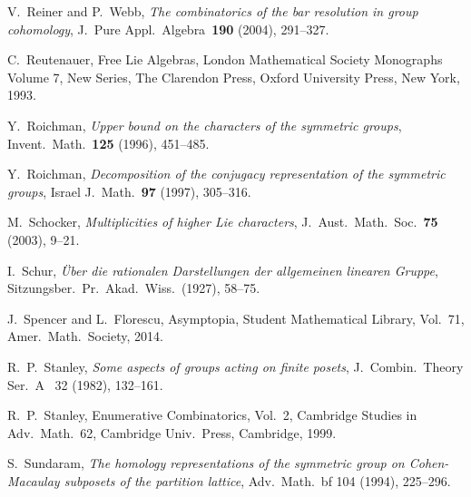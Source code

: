 \documentclass[12pt]%
{amsart}
\def\red#1{{\color{red}{#1}}}
\theoremstyle{plain}
\theoremstyle{definition}
\theoremstyle{remark}
\begin{document}
\begin{thebibliography}{}
    V.\ Reiner and P.\ Webb, 
    {\em The combinatorics of the bar resolution in group cohomology}, 
    J.\ Pure Appl.\ Algebra~{\bf 190} (2004), 291--327.

    C.\ Reutenauer, 
    Free Lie Algebras, 
    London Mathematical Society Monographs Volume 7, New Series, 
    The Clarendon Press, Oxford University Press, New York, 1993.

    Y.\ Roichman, 
    {\em Upper bound on the characters of the symmetric groups}, 
    Invent.\  Math.~{\bf 125} (1996), 451--485.
    
    Y.\ Roichman, 
    {\em Decomposition of the conjugacy representation of the symmetric groups}, 
    Israel J.\ Math.~{\bf 97} (1997), 305--316.

    M.\ Schocker, 
    {\em Multiplicities of higher Lie characters}, 
    J.\ Aust.\ Math.\ Soc.~{\bf 75} (2003), 9--21.

    I.\ Schur, 
    {\em \"Uber die rationalen Darstellungen der allgemeinen linearen Gruppe}, 
    Sitzungsber.\ Pr.\ Akad.\ Wiss.\ (1927), 58--75.

    J.\ Spencer and L.\ Florescu,
    Asymptopia, 
    Student Mathematical Library, Vol.\ 71, Amer.\ Math.\ Society, 2014.

    R.\ P.\ Stanley, 
    {\em Some aspects of groups acting on finite posets}, 
    J.\ Combin.\ Theory Ser.~A~{\bf} 32 (1982), 132--161.




    R.\ P.\ Stanley, 
    Enumerative Combinatorics, Vol.\ 2, 
    Cambridge Studies in Adv.\ Math.\ 62, Cambridge Univ.\ Press, Cambridge, 1999.  



    S.\ Sundaram, 
    {\em The homology representations of the symmetric group on Cohen-Macaulay subposets of the partition lattice}, 
    Adv.\ Math.~{bf 104} (1994), 225--296. 


\end{thebibliography}
\end{document}
